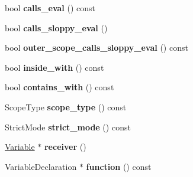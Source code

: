 \begin{DoxyCompactItemize}
\item 
\hypertarget{classv8_1_1internal_1_1_scope_a9c1e2e9ba6c6690f2330ab8807e444e7}{}bool {\bfseries calls\+\_\+eval} () const \label{classv8_1_1internal_1_1_scope_a9c1e2e9ba6c6690f2330ab8807e444e7}

\item 
\hypertarget{classv8_1_1internal_1_1_scope_a5618788fed324025ce66cf2dfca8d575}{}bool {\bfseries calls\+\_\+sloppy\+\_\+eval} ()\label{classv8_1_1internal_1_1_scope_a5618788fed324025ce66cf2dfca8d575}

\item 
\hypertarget{classv8_1_1internal_1_1_scope_ae475acb57007720d933eda11c8a14f5a}{}bool {\bfseries outer\+\_\+scope\+\_\+calls\+\_\+sloppy\+\_\+eval} () const \label{classv8_1_1internal_1_1_scope_ae475acb57007720d933eda11c8a14f5a}

\item 
\hypertarget{classv8_1_1internal_1_1_scope_a876d4310ccde172a49d6f7fc872e5f80}{}bool {\bfseries inside\+\_\+with} () const \label{classv8_1_1internal_1_1_scope_a876d4310ccde172a49d6f7fc872e5f80}

\item 
\hypertarget{classv8_1_1internal_1_1_scope_ae2ff8bd87995159f2d3a82afe15f318a}{}bool {\bfseries contains\+\_\+with} () const \label{classv8_1_1internal_1_1_scope_ae2ff8bd87995159f2d3a82afe15f318a}

\item 
\hypertarget{classv8_1_1internal_1_1_scope_ab63316382706e657dd1df9a8e1215cea}{}Scope\+Type {\bfseries scope\+\_\+type} () const \label{classv8_1_1internal_1_1_scope_ab63316382706e657dd1df9a8e1215cea}

\item 
\hypertarget{classv8_1_1internal_1_1_scope_a26193d3629a44c763bd44e175bc2c02e}{}Strict\+Mode {\bfseries strict\+\_\+mode} () const \label{classv8_1_1internal_1_1_scope_a26193d3629a44c763bd44e175bc2c02e}

\item 
\hypertarget{classv8_1_1internal_1_1_scope_a68df9b2021d65dd954c1535dec4280c6}{}\hyperlink{classv8_1_1internal_1_1_variable}{Variable} $\ast$ {\bfseries receiver} ()\label{classv8_1_1internal_1_1_scope_a68df9b2021d65dd954c1535dec4280c6}

\item 
\hypertarget{classv8_1_1internal_1_1_scope_a085bb7f233b867975bc29ec565697b0e}{}Variable\+Declaration $\ast$ {\bfseries function} () const \label{classv8_1_1internal_1_1_scope_a085bb7f233b867975bc29ec565697b0e}


\end{DoxyCompactItemize}

